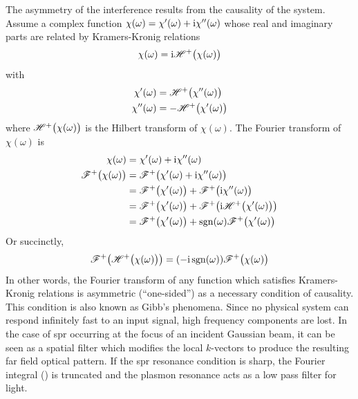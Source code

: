The asymmetry of the interference results from the causality of the system.
Assume a complex function $\chi(\omega) = \chi'(\omega) + {\mathrm{i}} \chi''(\omega)$
whose real and imaginary parts are related by Kramers-Kronig relations
\begin{align}
	\chi(\omega)={\mathrm{i}} {\mathscr{H}^{+}\bigl(\chi(\omega)\bigr)}
\end{align}
with
\begin{align}
	\chi'(\omega)  & = {\mathscr{H}^{+}\bigl(\chi''(\omega)\bigr)} \\
	\chi''(\omega) & = -{\mathscr{H}^{+}\bigl(\chi'(\omega)\bigr)}
\end{align}
where ${\mathscr{H}^{+}\bigl(\chi(\omega)\bigr)}$ is the Hilbert transform of $\chi(\omega)$.
The Fourier transform of $\chi(\omega)$ is
\begin{align}
	\chi(\omega)      & = \chi'(\omega) + {\mathrm{i}} \chi''(\omega)                   \\
	{\mathscr{F}^{+}\bigl(\chi(\omega)\bigr)} & = {\mathscr{F}^{+}\bigl(\chi'(\omega) + {\mathrm{i}} \chi''(\omega)\bigr)}              \\
	                  & = {\mathscr{F}^{+}\bigl(\chi'(\omega)\bigr)} + {\mathscr{F}^{+}\bigl({\mathrm{i}} \chi''(\omega)\bigr)}         \\
	                  & = {\mathscr{F}^{+}\bigl(\chi'(\omega)\bigr)} + {\mathscr{F}^{+}\bigl({\mathrm{i}} {\mathscr{H}^{+}\bigl(\chi'(\omega)\bigr)}\bigr)}     \\
	                  & = {\mathscr{F}^{+}\bigl(\chi'(\omega)\bigr)} + \operatorname{sgn}(\omega) {\mathscr{F}^{+}\bigl(\chi'(\omega)\bigr)} \\
\end{align}
Or succinctly,
\begin{align}
	{\mathscr{F}^{+}\bigl({\mathscr{H}^{+}\bigl(\chi(\omega)\bigr)}\bigr)} = (-{\mathrm{i}} \operatorname{sgn}(\omega)) {\mathscr{F}^{+}\bigl(\chi(\omega)\bigr)}
\end{align}
In other words, the Fourier transform of any function which satisfies
Kramers-Kronig relations is asymmetric (``one-sided'') as a necessary
condition of causality.  This condition is also known as Gibb's phenomena.
Since no physical system can respond infinitely fast to an input signal, high
frequency components are lost.  In the case of \gls{spr} occurring at the focus of
an incident Gaussian beam, it can be seen as a spatial filter which modifies
the local $k$-vectors to produce the resulting far field optical pattern.  If
the \gls{spr} resonance condition is sharp, the Fourier integral
() is truncated and the plasmon resonance acts as a
low pass filter for light.

